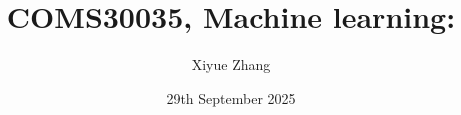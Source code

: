 \usepackage{amsmath, amssymb, graphicx}
\usepackage[]{algorithm2e}
\usepackage{pdfpages}
\usepackage{bm}
\usepackage{relsize}
\usepackage[british]{babel}
\usepackage{tikz,tikzsymbols}
\usepackage{hyperref}
\usepackage{cancel}
\usepackage{caption,subcaption}
\usepackage{adjustbox}
\usepackage{overpic}
\usepackage[UKenglish]{isodate}

\usetikzlibrary{arrows,decorations.markings}

\newcommand{\bs}{\boldsymbol}


\hypersetup{colorlinks,linkcolor=,urlcolor=blue}
\newenvironment{titledslide}[1]{\begin{frame}\frametitle{#1}}{\end{frame}}



\author{Xiyue Zhang}

\title{COMS30035, Machine learning:\\ \vspace{5pt} \lecttitle}

\date{29th September 2025} 


